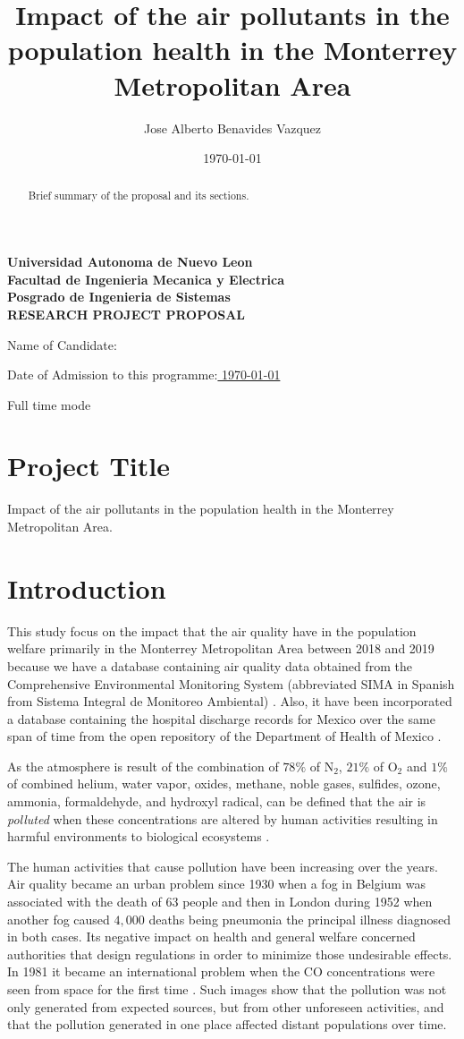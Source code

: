 \documentclass[
  11pt,
  a4paper,
  oneside
]{article}
\author{Jose Alberto Benavides Vazquez}
\date{\today}
\title{Impact of the air pollutants in the population health in the Monterrey Metropolitan Area}
\newcommand{\titlepart}{\thispagestyle{empty}
\pdfbookmark[0]{Front Page}{Front Page}
\label{sec:frontpage}
\begin{center}
\textbf{Universidad Autonoma de Nuevo Leon\\
Facultad de Ingenieria Mecanica y Electrica\\
Posgrado de Ingenieria de Sistemas\\
\vspace{3ex}
RESEARCH PROJECT PROPOSAL}
\end{center}

\vspace{6ex}

Name of Candidate:\uline{
\phantom{xxxxxxxxxxxxxxxxxxx}
\theauthor
\hfill\phantom{x}}

\vspace{3ex}

Date of Admission to this programme:\uline{
\phantom{xxxxx}
\admissionDate
\hfill\phantom{x}}

\vspace{3ex}

\studyTimeMode

\leftskip=0.32in}
\newcommand{\admissionDate}{\today}
\newcommand{\studyTimeMode}{Full time mode}
\begin{document}
\titlepart

\begin{abstract}
    Brief summary of the proposal and its sections.
\end{abstract}

\section{Project Title}
Impact of the air pollutants in the population health in the Monterrey Metropolitan Area.

\section{Introduction}
This study focus on the impact that the air quality have in the population welfare primarily in the Monterrey Metropolitan Area between 2018 and 2019 because we have a database containing air quality data obtained from the Comprehensive Environmental Monitoring System (abbreviated SIMA in Spanish from Sistema Integral de Monitoreo Ambiental) \citep{aireNL}. Also, it have been incorporated a database containing the hospital discharge records for Mexico over the same span of time from the open repository of the Department of Health of Mexico \cite{mexGobSS2020}.

As the atmosphere is result of the combination of $78\%$ of N$_2$,  $21\%$ of O$_2$ and $1\%$ of combined helium, water vapor, oxides, methane, noble gases, sulfides, ozone, ammonia, formaldehyde, and hydroxyl radical, can be defined that the air is \textit{polluted} when these concentrations are altered by human activities resulting in harmful environments to biological ecosystems \citep{thadEA2015}.

The human activities that cause pollution have been increasing over the years. Air quality became an urban problem since 1930 when a fog in Belgium was associated with the death of $63$ people and then in London during 1952 \citep{firket1936} when another fog caused $4,000$ deaths \citep{logan1953} being pneumonia the principal illness diagnosed in both cases. Its negative impact on health and general welfare concerned authorities that design regulations in order to minimize those undesirable effects. In 1981 it became an international problem when the CO concentrations were seen from space for the first time \citep{akimoto2003}. Such images show that the pollution was not only generated from expected sources, but from other unforeseen activities, and that the pollution generated in one place affected distant populations over time. 
\end{document}
